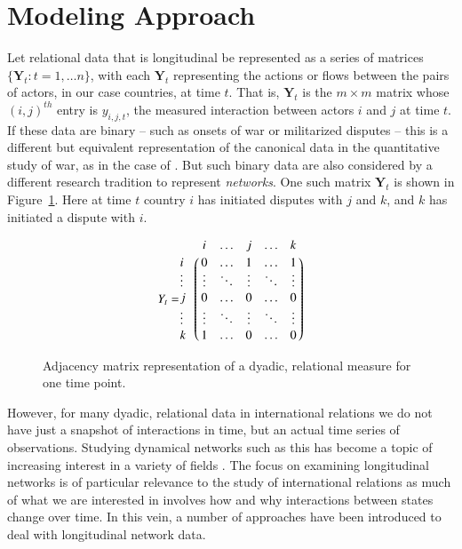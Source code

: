 \documentclass[3p,times,twocolumn,authoryear,12pt]{elsarticle}
\let\bbordermatrix\bordermatrix
\newcommand{\bl}[1]{{\mathbf #1}}
\begin{document}
\section{Modeling Approach}

Let relational data that is longitudinal be represented as a series of matrices $\{\bl Y_t : t = 1, \ldots n\}$, with each $\bl Y_t$ representing the actions or flows between the pairs of actors, in our case countries, at time $t$. That is, $\bl Y_t$ is the $m\times m$ matrix whose $(i,j)^{th}$ entry is $y_{i,j,t}$, the measured interaction between actors $i$ and $j$ at time $t$. If these data are binary -- such as onsets of war or militarized disputes -- this is a different but equivalent representation of the canonical data in the quantitative study of war, as in the case of \citet{jung:2014}. But such binary data are also considered by a different research tradition to represent {\em networks}. One such matrix  $\bl Y_t$ is shown in Figure~\ref{fig:matrix}. Here at time $t$ country $i$ has initiated disputes with $j$ and $k$, and $k$ has initiated a dispute with $i$. 

\begin{figure}[ht]
\begin{equation*}
Y_{t} = \bbordermatrix{
	~ & i  & \ldots & j & \ldots & k \cr
	i & 0  & \ldots & 1 & \ldots & 1 \cr
	\vdots & \vdots & \ddots & \vdots & \ddots & \vdots  \cr
	j & 0  & \ldots & 0  & \ldots & 0 \cr 
	\vdots & \vdots & \ddots & \vdots & \ddots & \vdots \cr
	k & 1  & \ldots & 0  & \ldots & 0 \cr 		
	}
\end{equation*}
	\caption{Adjacency matrix representation of a dyadic, relational measure for one time point.}
	\label{fig:matrix}
\end{figure}

However, for many dyadic, relational data in international relations we do not have just a snapshot of interactions in time, but an actual time series of observations. Studying dynamical networks such as this has become a topic of increasing interest in a variety of fields \citep{holme:saramaki:2012}. The focus on examining longitudinal networks is of particular relevance to the study of international relations as much of what we are interested in involves how and why interactions between states change over time. In this vein, a number of approaches have been introduced to deal with longitudinal network data. 
\end{document}
